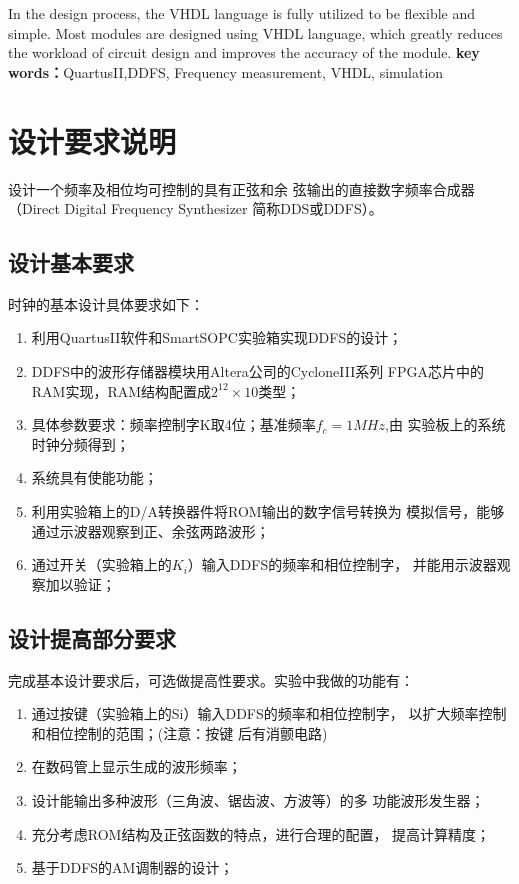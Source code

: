 \documentclass[12pt]{article}
\begin{document}
In the design process, the VHDL language is fully utilized to be flexible and simple. Most modules are designed using VHDL language, which greatly reduces the workload of circuit design and improves the accuracy of the module.\newline\newline
\textbf{key words：}QuartusII,DDFS,
Frequency measurement,
VHDL,
simulation
\newpage
\thispagestyle{empty}
\tableofcontents
\thispagestyle{empty}
\newpage
\setcounter{page}{1}
\section{设计要求说明}
设计一个频率及相位均可控制的具有正弦和余
弦输出的直接数字频率合成器（Direct Digital
Frequency Synthesizer 简称DDS或DDFS）。
\subsection{设计基本要求}
时钟的基本设计具体要求如下：
\begin{enumerate}[1、]
\item 利用QuartusII软件和SmartSOPC实验箱实现DDFS的设计；
\item DDFS中的波形存储器模块用Altera公司的CycloneIII系列
FPGA芯片中的RAM实现，RAM结构配置成$2^{12}\times 10$类型；
\item 具体参数要求：频率控制字K取4位；基准频率$f_c=1MHz$,由
实验板上的系统时钟分频得到；
\item 系统具有使能功能；
\item 利用实验箱上的D/A转换器件将ROM输出的数字信号转换为
模拟信号，能够通过示波器观察到正、余弦两路波形；
\item 通过开关（实验箱上的$K_i$）输入DDFS的频率和相位控制字，
并能用示波器观察加以验证；
\end{enumerate}
\subsection{设计提高部分要求}
完成基本设计要求后，可选做提高性要求。实验中我做的功能有：
\begin{enumerate}[1、]
\item 通过按键（实验箱上的Si）输入DDFS的频率和相位控制字，
以扩大频率控制和相位控制的范围；(注意：按键
后有消颤电路)
\item 在数码管上显示生成的波形频率；
\item 设计能输出多种波形（三角波、锯齿波、方波等）的多
功能波形发生器；
\item 充分考虑ROM结构及正弦函数的特点，进行合理的配置，
提高计算精度；
\item 基于DDFS的AM调制器的设计；
\end{enumerate}
\end{document}
